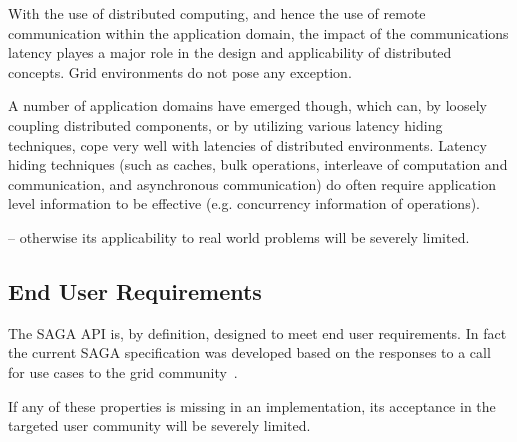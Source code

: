    With the use of distributed computing, and hence the
   use of remote communication within the application domain, the
   impact of the communications latency playes a major role in the
   design and applicability of distributed concepts.  Grid
   environments do not pose any exception.  
   
   A number of application domains have emerged though, which can, by
   loosely coupling distributed components, or by utilizing
   various latency hiding techniques, cope very well with latencies of
   distributed environments.  Latency hiding techniques (such as
   caches, bulk operations, interleave of computation and
   communication, and asynchronous communication) do often require
   application level information to be effective (e.g. concurrency
   information of operations).  
   
    -- otherwise its applicability to real world
   problems will be severely limited.


 \subsection{End User Requirements}

   The SAGA API is, by definition, designed to meet end user
   requirements.  In fact the current SAGA specification was developed
   based on the responses to a call for use cases to the grid 
   community~\cite{saga_req, saga_uc}.
   
   
   If any of these properties is missing in an implementation, its
   acceptance in the targeted user community will be severely limited.


